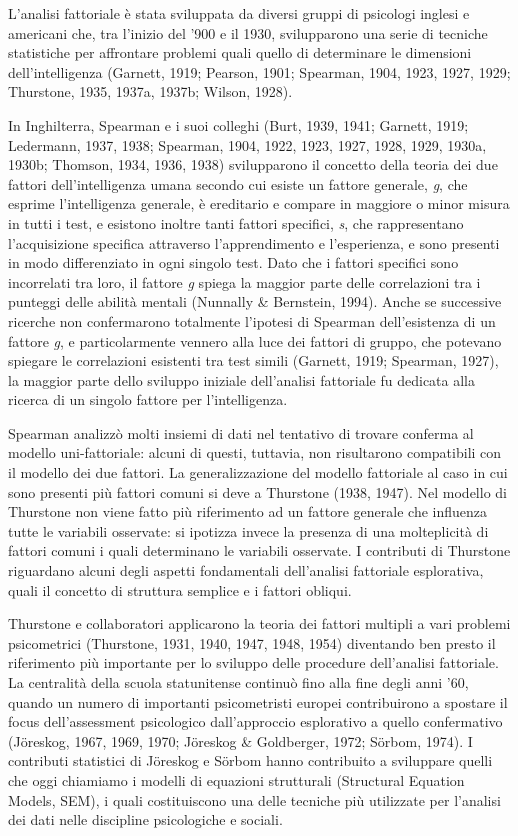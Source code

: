 L'analisi fattoriale è stata sviluppata da diversi gruppi di psicologi inglesi e americani che, tra l'inizio del '900 e il 1930, svilupparono una serie di tecniche statistiche per affrontare problemi quali quello di determinare le dimensioni dell'intelligenza (Garnett, 1919; Pearson, 1901; Spearman, 1904, 1923, 1927, 1929; Thurstone, 1935, 1937a, 1937b; Wilson, 1928). 

In Inghilterra, Spearman e i suoi colleghi (Burt, 1939, 1941;
Garnett, 1919; Ledermann, 1937, 1938; Spearman, 1904, 1922, 1923, 1927,
1928, 1929, 1930a, 1930b; Thomson, 1934, 1936, 1938) svilupparono il concetto della teoria dei due fattori dell'intelligenza umana secondo cui esiste un fattore generale, \emph{g}, che esprime l'intelligenza generale, è ereditario e compare in maggiore o minor misura in tutti i test, e esistono inoltre tanti fattori specifici, \emph{s}, che rappresentano l'acquisizione specifica attraverso l'apprendimento e l'esperienza, e sono presenti in  modo differenziato in ogni singolo test. Dato che i fattori specifici sono incorrelati tra loro, il fattore \emph{g} spiega la maggior parte delle correlazioni tra i punteggi delle abilità mentali (Nunnally \& Bernstein, 1994). 
Anche se successive ricerche non confermarono totalmente l'ipotesi di Spearman dell'esistenza di un fattore \emph{g}, e particolarmente vennero alla luce dei fattori di gruppo, che potevano spiegare le correlazioni esistenti tra test simili (Garnett, 1919; Spearman, 1927), la maggior parte dello sviluppo iniziale dell'analisi fattoriale fu dedicata alla ricerca di un singolo fattore per l'intelligenza.

Spearman analizzò molti insiemi di dati nel tentativo di trovare conferma al modello uni-fattoriale: alcuni di questi, tuttavia, non risultarono compatibili con il modello dei due fattori.  La generalizzazione del modello fattoriale al caso in cui sono presenti più fattori comuni si deve a Thurstone (1938, 1947).  Nel modello di Thurstone non viene fatto più riferimento ad un fattore generale che influenza tutte le variabili osservate: si ipotizza invece la presenza di una molteplicità di fattori comuni i quali determinano le variabili osservate. I contributi di Thurstone riguardano alcuni degli aspetti fondamentali dell'analisi fattoriale esplorativa, quali il concetto di struttura semplice e i fattori obliqui.

Thurstone e collaboratori applicarono la teoria dei fattori multipli a vari problemi psicometrici (Thurstone, 1931, 1940, 1947, 1948, 1954) diventando ben presto il riferimento più importante per lo sviluppo delle procedure dell'analisi fattoriale. La centralità della scuola statunitense continuò fino alla fine degli anni '60, quando un numero di importanti psicometristi europei contribuirono a spostare il focus dell'assessment psicologico dall'approccio esplorativo a quello confermativo (J\"oreskog, 1967, 1969, 1970; Jöreskog \& Goldberger, 1972; Sörbom, 1974). I contributi statistici di Jöreskog e Sörbom hanno contribuito a sviluppare quelli che oggi chiamiamo i modelli di equazioni strutturali (Structural Equation Models, SEM), i quali costituiscono una delle tecniche più utilizzate per l'analisi dei dati nelle discipline
psicologiche e sociali. 

